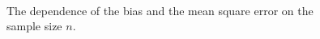 \documentclass[conference,onecolumn]{IEEEtran}
\begin{document}
\begin{figure}[htbp]
	\centering
	\ 
	\ 
	\caption{The dependence of the bias and the mean square error on the sample size $n$.}
	\label{Fig:Monte_Carlo}
\end{figure}
\end{document}
